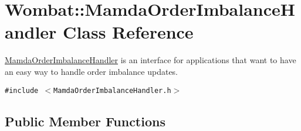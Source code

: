 \hypertarget{classWombat_1_1MamdaOrderImbalanceHandler}{
\section{Wombat::Mamda\-Order\-Imbalance\-Handler Class Reference}
\label{classWombat_1_1MamdaOrderImbalanceHandler}
}
\hyperlink{classWombat_1_1MamdaOrderImbalanceHandler}{Mamda\-Order\-Imbalance\-Handler} is an interface for applications that want to have an easy way to handle order imbalance updates.  


{\tt \#include $<$Mamda\-Order\-Imbalance\-Handler.h$>$}

\subsection*{Public Member Functions}
